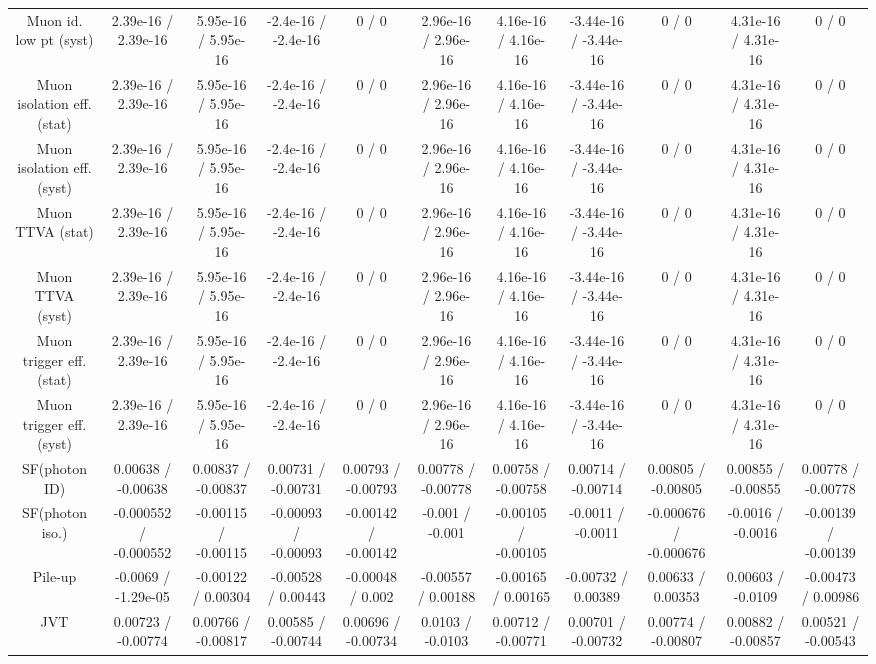 \begin{table}[htbp]
\begin{center}
\begin{tabular}{|c|c|c|c|c|c|c|c|c|c|c|}
  Muon id. low pt (syst) & 2.39e-16 / 2.39e-16 & 5.95e-16 / 5.95e-16 & -2.4e-16 / -2.4e-16 & 0 / 0 & 2.96e-16 / 2.96e-16 & 4.16e-16 / 4.16e-16 & -3.44e-16 / -3.44e-16 & 0 / 0 & 4.31e-16 / 4.31e-16 & 0 / 0 \\ 
  Muon isolation eff. (stat) & 2.39e-16 / 2.39e-16 & 5.95e-16 / 5.95e-16 & -2.4e-16 / -2.4e-16 & 0 / 0 & 2.96e-16 / 2.96e-16 & 4.16e-16 / 4.16e-16 & -3.44e-16 / -3.44e-16 & 0 / 0 & 4.31e-16 / 4.31e-16 & 0 / 0 \\ 
  Muon isolation eff. (syst) & 2.39e-16 / 2.39e-16 & 5.95e-16 / 5.95e-16 & -2.4e-16 / -2.4e-16 & 0 / 0 & 2.96e-16 / 2.96e-16 & 4.16e-16 / 4.16e-16 & -3.44e-16 / -3.44e-16 & 0 / 0 & 4.31e-16 / 4.31e-16 & 0 / 0 \\ 
  Muon TTVA (stat) & 2.39e-16 / 2.39e-16 & 5.95e-16 / 5.95e-16 & -2.4e-16 / -2.4e-16 & 0 / 0 & 2.96e-16 / 2.96e-16 & 4.16e-16 / 4.16e-16 & -3.44e-16 / -3.44e-16 & 0 / 0 & 4.31e-16 / 4.31e-16 & 0 / 0 \\ 
  Muon TTVA (syst) & 2.39e-16 / 2.39e-16 & 5.95e-16 / 5.95e-16 & -2.4e-16 / -2.4e-16 & 0 / 0 & 2.96e-16 / 2.96e-16 & 4.16e-16 / 4.16e-16 & -3.44e-16 / -3.44e-16 & 0 / 0 & 4.31e-16 / 4.31e-16 & 0 / 0 \\ 
  Muon trigger eff. (stat) & 2.39e-16 / 2.39e-16 & 5.95e-16 / 5.95e-16 & -2.4e-16 / -2.4e-16 & 0 / 0 & 2.96e-16 / 2.96e-16 & 4.16e-16 / 4.16e-16 & -3.44e-16 / -3.44e-16 & 0 / 0 & 4.31e-16 / 4.31e-16 & 0 / 0 \\ 
  Muon trigger eff. (syst) & 2.39e-16 / 2.39e-16 & 5.95e-16 / 5.95e-16 & -2.4e-16 / -2.4e-16 & 0 / 0 & 2.96e-16 / 2.96e-16 & 4.16e-16 / 4.16e-16 & -3.44e-16 / -3.44e-16 & 0 / 0 & 4.31e-16 / 4.31e-16 & 0 / 0 \\ 
  SF(photon ID) & 0.00638 / -0.00638 & 0.00837 / -0.00837 & 0.00731 / -0.00731 & 0.00793 / -0.00793 & 0.00778 / -0.00778 & 0.00758 / -0.00758 & 0.00714 / -0.00714 & 0.00805 / -0.00805 & 0.00855 / -0.00855 & 0.00778 / -0.00778 \\ 
  SF(photon iso.) & -0.000552 / -0.000552 & -0.00115 / -0.00115 & -0.00093 / -0.00093 & -0.00142 / -0.00142 & -0.001 / -0.001 & -0.00105 / -0.00105 & -0.0011 / -0.0011 & -0.000676 / -0.000676 & -0.0016 / -0.0016 & -0.00139 / -0.00139 \\ 
  Pile-up & -0.0069 / -1.29e-05 & -0.00122 / 0.00304 & -0.00528 / 0.00443 & -0.00048 / 0.002 & -0.00557 / 0.00188 & -0.00165 / 0.00165 & -0.00732 / 0.00389 & 0.00633 / 0.00353 & 0.00603 / -0.0109 & -0.00473 / 0.00986 \\ 
  JVT & 0.00723 / -0.00774 & 0.00766 / -0.00817 & 0.00585 / -0.00744 & 0.00696 / -0.00734 & 0.0103 / -0.0103 & 0.00712 / -0.00771 & 0.00701 / -0.00732 & 0.00774 / -0.00807 & 0.00882 / -0.00857 & 0.00521 / -0.00543 \\ 

\end{tabular}
\end{center}
\end{table}
